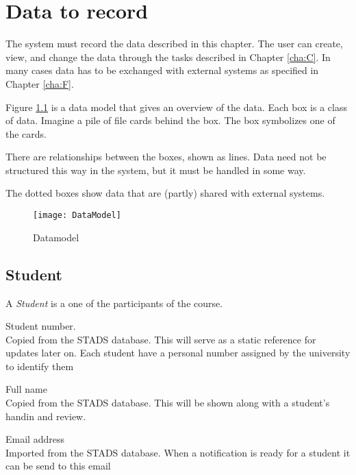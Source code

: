 \documentclass[Main]{subfiles}
\begin{document}
\chapter{Data to record}
The system must record the data described in this chapter. The user can create, view, and change the data through the tasks described in Chapter \ref{cha:C}. 
In many cases data has to be exchanged with external systems as specified in Chapter \ref{cha:F}.

Figure \ref{fig:Datamodel} is a data model that gives an overview of the data. 
Each box is a class of data. 
Imagine a pile of file cards behind the box. 
The box symbolizes one of the cards. 

There are relationships between the boxes, shown as lines.
Data need not be structured this way in the system, but it must be handled in some way. 

The dotted boxes show data that are (partly) shared with external systems. 

\begin{figure}[hbtp]
\centering
\texttt{[image: DataModel]}
\caption{Datamodel}
\label{fig:Datamodel}
\end{figure}


\newpage

\section{Student}
A \textit{Student} is a one of the participants of the course.
\begin{DataIntro}
\rExample{}
\end{DataIntro}

\begin{DataTable}

\Record
{Student number. 
\\
Copied from the STADS database. 
This will serve as a static reference for updates later on.}
{Each student have a personal number assigned by the university to identify them}
{}

\Record
{Full name\\
Copied from the STADS database.}
{This will be shown along with a student's handin and review.}
{}

\Record
{Email address\\
Imported from the STADS database.}
{When a notification is ready for a student it can be send to this email}
{}
\end{DataTable}
\end{document}
